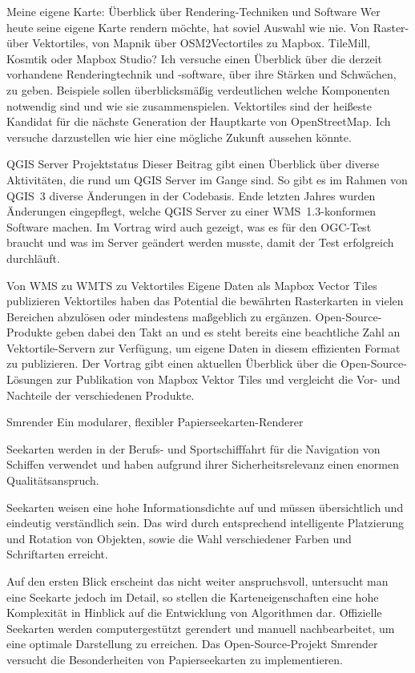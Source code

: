%
{Meine eigene Karte: Überblick über Rendering-Techniken und Software}%
{}%
{Wer heute seine eigene Karte rendern möchte, hat soviel Auswahl wie nie. Von Raster- über
Vektortiles, von Mapnik über OSM2Vectortiles zu Mapbox. TileMill, Kosmtik oder Mapbox Studio? Ich
versuche einen Überblick über die derzeit vorhandene Renderingtechnik und -software, über ihre
Stärken und Schwächen, zu geben. Beispiele sollen überblicksmäßig verdeutlichen welche Komponenten
notwendig sind und wie sie zusammenspielen. Vektortiles sind der heißeste Kandidat für die nächste
Generation der Hauptkarte von OpenStreetMap. Ich versuche darzustellen wie hier eine mögliche
Zukunft aussehen könnte.}


%
{QGIS Server Projektstatus}%
{}%
{Dieser Beitrag gibt einen Überblick über diverse Aktivitäten, die rund um QGIS
Server im Gange sind. So gibt es im Rahmen von QGIS~3 diverse Änderungen in der
Codebasis. Ende letzten Jahres wurden Änderungen eingepflegt, welche QGIS
Server zu einer WMS~1.3-konformen Software machen. Im Vortrag wird auch
gezeigt, was es für den OGC-Test braucht und was im Server geändert werden
musste, damit der Test erfolgreich durchläuft.}

%
{Von WMS zu WMTS zu Vektortiles}%
{Eigene Daten als Mapbox Vector Tiles publizieren}%
{Vektortiles haben das Potential die bewährten
Rasterkarten in vielen Bereichen abzulösen oder mindestens maßgeblich zu ergänzen.
Open-Source-Produkte geben dabei den Takt an und es steht bereits eine beachtliche Zahl an
Vektortile-Servern zur Verfügung, um eigene Daten in diesem effizienten Format zu publizieren. Der
Vortrag gibt einen aktuellen Überblick über die Open-Source-Lösungen zur Publikation von Mapbox
Vektor Tiles und vergleicht die Vor- und Nachteile der verschiedenen Produkte. }

%
{Smrender}%
{Ein modularer, flexibler Papierseekarten-Renderer}%
{Seekarten werden in der Berufs- und Sportschifffahrt für die Navigation von
Schiffen verwendet und haben aufgrund ihrer Sicherheitsrelevanz einen enormen
Qualitätsanspruch.

Seekarten weisen eine hohe Informationsdichte auf und müssen übersichtlich und
eindeutig verständlich sein. Das wird durch entsprechend intelligente
Platzierung und Rotation von Objekten, sowie die Wahl verschiedener Farben und
Schriftarten erreicht.

Auf den ersten Blick erscheint das nicht weiter anspruchsvoll, untersucht man
eine Seekarte jedoch im Detail, so stellen die Karteneigenschaften eine hohe
Komplexität in Hinblick auf die Entwicklung von Algorithmen dar.
Offizielle Seekarten werden computergestützt gerendert und manuell
nachbearbeitet, um eine optimale Darstellung zu erreichen.
Das Open-Source-Projekt Smrender versucht die Besonderheiten von Papierseekarten
zu implementieren.}

